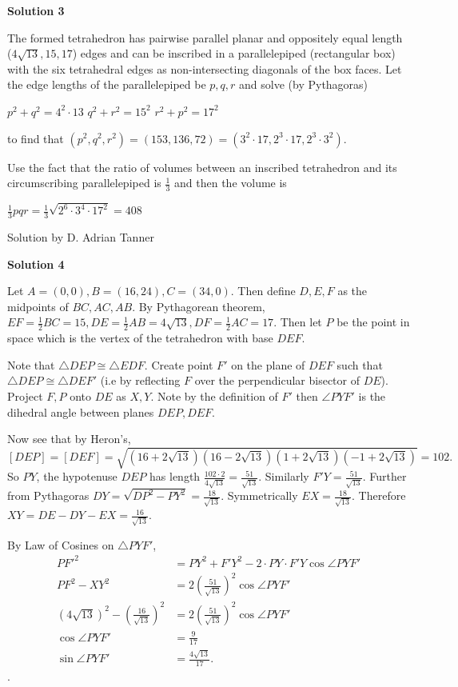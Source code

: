 \begin{enumerate}
 



\textbf{Solution 3}

The formed tetrahedron has pairwise parallel planar and oppositely equal length ($4\sqrt{13},15,17$) edges and can be inscribed in a parallelepiped (rectangular box) with the six tetrahedral edges as non-intersecting diagonals of the box faces.  Let the edge lengths of the parallelepiped be $p,q,r$ and solve (by Pythagoras)

 $p^2+q^2=4^2\cdot{13}$
$q^2+r^2=15^2$
$r^2+p^2=17^2$

 to find that $(p^2,q^2,r^2)=(153,136,72)=(3^2\cdot{17},2^3\cdot{17},2^3\cdot{3^2}).$

 Use the fact that the ratio of volumes between an inscribed tetrahedron and its circumscribing parallelepiped is $\frac{1}{3}$ and then the volume is

 $\frac{1}{3}pqr=\frac{1}{3}\sqrt{2^6\cdot{3^4}\cdot{17^2}}=\boxed{408}$

 
Solution by D. Adrian Tanner

 



\textbf{Solution 4}

Let $A = (0,0), B = (16, 24), C = (34,0).$ Then define $D,E,F$ as the midpoints of $BC, AC, AB$. By Pythagorean theorem, $EF = \frac{1}{2} BC = 15, DE = \frac{1}{2}AB = 4 \sqrt{13}, DF = \frac{1}{2} AC = 17.$ Then let $P$ be the point in space which is the vertex of the tetrahedron with base $DEF$. 

 
Note that $\triangle DEP \cong \triangle EDF$. Create point $F'$ on the plane of $DEF$ such that $\triangle DEP \cong \triangle DEF'$ (i.e by reflecting $F$ over the perpendicular bisector of $DE$). Project $F, P$ onto $DE$ as $X, Y$. Note by the definition of $F'$ then $\angle PYF'$ is the dihedral angle between planes $DEP, DEF$.

 Now see that by Heron's, 
 \[[DEP] = [DEF] = \sqrt{(16 + 2 \sqrt{13})(16 - 2 \sqrt{13})(1 + 2 \sqrt{13})(-1 + 2 \sqrt{13})} = 102.\]So $PY$, the hypotenuse $DEP$ has length $\frac{102 \cdot 2}{4 \sqrt{13}} = \frac{51}{\sqrt{13}}$. Similarly $F'Y = \frac{51}{\sqrt{13}}.$ Further from Pythagoras $DY = \sqrt{DP^2 - PY^2} = \frac{18}{\sqrt{13}}.$ Symmetrically $EX = \frac{18}{\sqrt{13}}.$ Therefore $XY = DE - DY - EX = \frac{16}{\sqrt{13}}.$

 By Law of Cosines on $\triangle PYF'$,
 \begin{align*} PF'^2 &= PY^2 + F'Y^2 - 2 \cdot PY \cdot F'Y \cos{\angle PYF'} \\ PF^2 - XY^2 &= 2 (\frac{51}{\sqrt{13}})^2 \cos{\angle PYF'} \\ (4\sqrt{13})^2 - (\frac{16}{\sqrt{13}})^2 &= 2 (\frac{51}{\sqrt{13}})^2 \cos{\angle PYF'}  \\ \cos{\angle PYF'} &= \frac{9}{17} \\ \sin{\angle PYF'} &= \frac{4 \sqrt{13}}{17}. \end{align*}
.


\end{enumerate}

